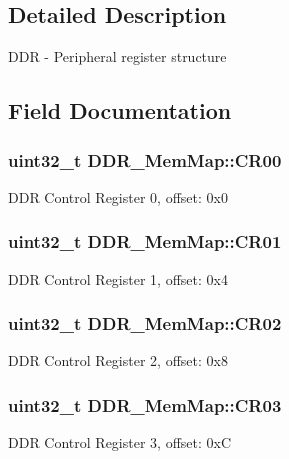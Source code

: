 \subsection{Detailed Description}
D\+D\+R -\/ Peripheral register structure 

\subsection{Field Documentation}
\hypertarget{struct_d_d_r___mem_map_a9e2a08fd3e016d4fed8f6011d07ca770}{}
\subsubsection[{C\+R00}]{\setlength{\rightskip}{0pt plus 5cm}uint32\+\_\+t D\+D\+R\+\_\+\+Mem\+Map\+::\+C\+R00}\label{struct_d_d_r___mem_map_a9e2a08fd3e016d4fed8f6011d07ca770}
D\+D\+R Control Register 0, offset\+: 0x0 \hypertarget{struct_d_d_r___mem_map_af1dc0e0c5a179c7a8fda956060e0e4bc}{}
\subsubsection[{C\+R01}]{\setlength{\rightskip}{0pt plus 5cm}uint32\+\_\+t D\+D\+R\+\_\+\+Mem\+Map\+::\+C\+R01}\label{struct_d_d_r___mem_map_af1dc0e0c5a179c7a8fda956060e0e4bc}
D\+D\+R Control Register 1, offset\+: 0x4 \hypertarget{struct_d_d_r___mem_map_a5364339b60e833e81fba593e0bf881c2}{}
\subsubsection[{C\+R02}]{\setlength{\rightskip}{0pt plus 5cm}uint32\+\_\+t D\+D\+R\+\_\+\+Mem\+Map\+::\+C\+R02}\label{struct_d_d_r___mem_map_a5364339b60e833e81fba593e0bf881c2}
D\+D\+R Control Register 2, offset\+: 0x8 \hypertarget{struct_d_d_r___mem_map_a38710acc7d8645341d7555a75e15b3e7}{}
\subsubsection[{C\+R03}]{\setlength{\rightskip}{0pt plus 5cm}uint32\+\_\+t D\+D\+R\+\_\+\+Mem\+Map\+::\+C\+R03}\label{struct_d_d_r___mem_map_a38710acc7d8645341d7555a75e15b3e7}
D\+D\+R Control Register 3, offset\+: 0x\+C \hypertarget{struct_d_d_r___mem_map_a01670a4f2214c3e8d43ddcc88b66bf63}{}
